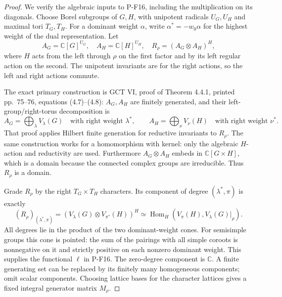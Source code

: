 \documentclass[11pt,a4paper]{article}
\begin{document}
\begin{proof}
We verify the algebraic inputs to P-F16, including the multiplication
on its diagonals. Choose Borel subgroups of $G,H$, with unipotent
radicals $U_G,U_H$ and maximal tori $T_G,T_H$.
For a dominant weight $\alpha$, write
$\alpha^*=-w_0\alpha$ for the highest weight of the dual representation.
Let
\[
 A_G=\mathbb C[G]^{U_G},\quad
 A_H=\mathbb C[H]^{U_H},\quad
 R_\rho=(A_G\otimes A_H)^H,
 \tag{P-F17c}
\]
where $H$ acts from the left through $\rho$ on the first factor and
by its left regular action on the second. The unipotent invariants
are for the right actions, so the left and right actions commute.

The exact primary construction is GCT VI, proof of Theorem 4.4.1,
printed pp.~75--76, equations (4.7)--(4.8): $A_G,A_H$ are finitely
generated, and their left-group/right-torus decomposition is
\[
 A_G=\bigoplus_{\lambda}V_\lambda(G)
       \quad\text{with right weight }\lambda^*,\qquad
 A_H=\bigoplus_{\nu}V_\nu(H)
       \quad\text{with right weight }\nu^*.
\]
That proof applies Hilbert finite generation for reductive invariants
to $R_\rho$. The same construction works for a homomorphism with
kernel: only the algebraic $H$-action and reductivity are used.
Furthermore $A_G\otimes A_H$ embeds in $\mathbb C[G\times H]$,
which is a domain because the connected complex groups are
irreducible. Thus $R_\rho$ is a domain.

Grade $R_\rho$ by the right $T_G\times T_H$ characters. Its component
of degree $(\lambda^*,\pi)$ is exactly
\[
 (R_\rho)_{(\lambda^*,\pi)}
   =(V_\lambda(G)\otimes V_{\pi^*}(H))^H
   \simeq\operatorname{Hom}_H(V_\pi(H),V_\lambda(G)|_\rho).
 \tag{P-F17d}
\]
All degrees lie in the product of the two dominant-weight cones.
For semisimple groups this cone is pointed: the sum of the pairings
with all simple coroots is nonnegative on it and strictly positive
on each nonzero dominant weight. This supplies the functional $\ell$
in P-F16. The zero-degree component is $\mathbb C$. A finite generating
set can be replaced by its finitely many homogeneous components;
omit scalar components. Choosing lattice bases for the character
lattices gives a fixed integral generator matrix $M_\rho$.


\end{proof}
\end{document}
